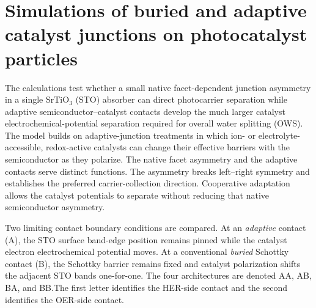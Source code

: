 \documentclass[11pt]{article}
\begin{document}
\section{Simulations of buried and adaptive catalyst junctions on photocatalyst particles}
\label{sec:spatial-model}

The calculations test whether a small native facet-dependent junction asymmetry in a single SrTiO$_3$ (STO) absorber can direct photocarrier separation while adaptive semiconductor--catalyst contacts develop the much larger catalyst electrochemical-potential separation required for overall water splitting (OWS). The model builds on adaptive-junction treatments in which ion- or electrolyte-accessible, redox-active catalysts can change their effective barriers with the semiconductor as they polarize.\cite{lin2014,mills2014,nellist2016} The native facet asymmetry and the adaptive contacts serve distinct functions. The asymmetry breaks left--right symmetry and establishes the preferred carrier-collection direction. Cooperative adaptation allows the catalyst potentials to separate without reducing that native semiconductor asymmetry.

Two limiting contact boundary conditions are compared. At an \emph{adaptive} contact (A), the STO surface band-edge position remains pinned while the catalyst electron electrochemical potential moves. At a conventional \emph{buried} Schottky contact (B), the Schottky barrier remains fixed and catalyst polarization shifts the adjacent STO bands one-for-one. The four architectures are denoted AA, AB, BA, and BB.\@ The first letter identifies the HER-side contact and the second identifies the OER-side contact.

\renewcommand{\thefigure}{S\arabic{figure}}
\setcounter{figure}{14}
\renewcommand{\thetable}{S\arabic{table}}
\setcounter{table}{6}
\end{document}
